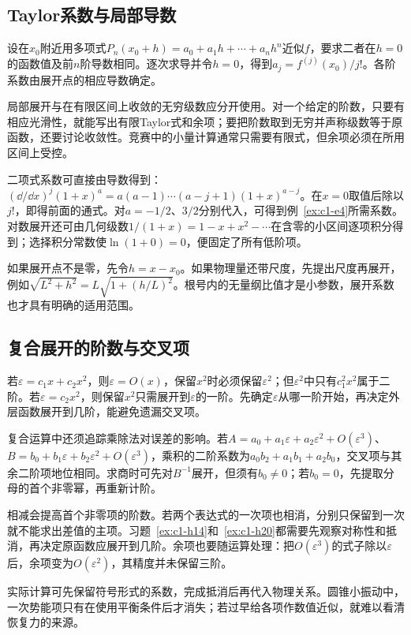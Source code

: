 \subsection{Taylor系数与局部导数}
设在$x_0$附近用多项式$P_n(x_0+h)=a_0+a_1h+\cdots+a_nh^n$近似$f$，要求二者在$h=0$的函数值及前$n$阶导数相同。逐次求导并令$h=0$，得到$a_j=f^{(j)}(x_0)/j!$。各阶系数由展开点的相应导数确定。

局部展开与在有限区间上收敛的无穷级数应分开使用。对一个给定的阶数，只要有相应光滑性，就能写出有限Taylor式和余项；要把阶数取到无穷并声称级数等于原函数，还要讨论收敛性。竞赛中的小量计算通常只需要有限式，但余项必须在所用区间上受控。

二项式系数可直接由导数得到：$(\dd/\dd x)^j(1+x)^a=a(a-1)\cdots(a-j+1)(1+x)^{a-j}$。在$x=0$取值后除以$j!$，即得前面的通式。对$a=-1/2$、$3/2$分别代入，可得到例~\ref{ex:c1-e4}所需系数。对数展开还可由几何级数$1/(1+x)=1-x+x^2-\cdots$在含零的小区间逐项积分得到；选择积分常数使$\ln(1+0)=0$，便固定了所有低阶项。

如果展开点不是零，先令$h=x-x_0$。如果物理量还带尺度，先提出尺度再展开，例如$\sqrt{L^2+h^2}=L\sqrt{1+(h/L)^2}$。根号内的无量纲比值才是小参数，展开系数也才具有明确的适用范围。

\subsection{复合展开的阶数与交叉项}
若$\varepsilon=c_1x+c_2x^2$，则$\varepsilon=O(x)$，保留$x^2$时必须保留$\varepsilon^2$；但$\varepsilon^2$中只有$c_1^2x^2$属于二阶。若$\varepsilon=c_2x^2$，则保留$x^2$只需展开到$\varepsilon$的一阶。先确定$\varepsilon$从哪一阶开始，再决定外层函数展开到几阶，能避免遗漏交叉项。

复合运算中还须追踪乘除法对误差的影响。若$A=a_0+a_1\varepsilon+a_2\varepsilon^2+O(\varepsilon^3)$、$B=b_0+b_1\varepsilon+b_2\varepsilon^2+O(\varepsilon^3)$，乘积的二阶系数为$a_0b_2+a_1b_1+a_2b_0$，交叉项与其余二阶项地位相同。求商时可先对$B^{-1}$展开，但须有$b_0\ne0$；若$b_0=0$，先提取分母的首个非零幂，再重新计阶。

相减会提高首个非零项的阶数。若两个表达式的一次项也相消，分别只保留到一次就不能求出差值的主项。习题~\ref{ex:c1-h14}和~\ref{ex:c1-h20}都需要先观察对称性和抵消，再决定原函数应展开到几阶。余项也要随运算处理：把$O(\varepsilon^3)$的式子除以$\varepsilon$后，余项变为$O(\varepsilon^2)$，其精度并未保留三阶。

实际计算可先保留符号形式的系数，完成抵消后再代入物理关系。圆锥小振动中，一次势能项只有在使用平衡条件后才消失；若过早给各项作数值近似，就难以看清恢复力的来源。

